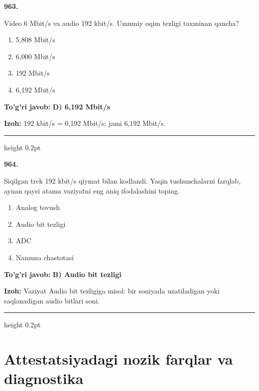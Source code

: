 \documentclass[10pt,a4paper,oneside]{article}
\begin{document}
\noindent\textbf{\color{ink}963.}
\par
Video 6 Mbit/s va audio 192 kbit/s. Umumiy oqim tezligi taxminan qancha?
\begin{enumerate}[label=\Alph*),leftmargin=9mm]
\item 5,808 Mbit/s
\item 6,000 Mbit/s
\item 192 Mbit/s
\item 6,192 Mbit/s
\end{enumerate}
\begin{tcolorbox}[enhanced,breakable,colback=teal!4,colframe=teal!50!black,boxrule=0.5pt,arc=1.1mm,left=3mm,right=3mm,top=1.7mm,bottom=1.7mm,before skip=2mm,after skip=2mm]
\textbf{\color{teal}To'g'ri javob:} \textbf{D) 6,192 Mbit/s}
\par\smallskip
\textbf{Izoh:} 192 kbit/s = 0,192 Mbit/s; jami 6,192 Mbit/s.
\end{tcolorbox}
\vspace{2mm}\hrule height 0.2pt \vspace{3mm}

\noindent\textbf{\color{ink}964.}
\par
Siqilgan trek 192 kbit/s qiymat bilan kodlandi. Yaqin tushunchalarni farqlab, aynan qaysi atama vaziyatni eng aniq ifodalashini toping.
\begin{enumerate}[label=\Alph*),leftmargin=9mm]
\item Analog tovush
\item Audio bit tezligi
\item ADC
\item Namuna chastotasi
\end{enumerate}
\begin{tcolorbox}[enhanced,breakable,colback=teal!4,colframe=teal!50!black,boxrule=0.5pt,arc=1.1mm,left=3mm,right=3mm,top=1.7mm,bottom=1.7mm,before skip=2mm,after skip=2mm]
\textbf{\color{teal}To'g'ri javob:} \textbf{B) Audio bit tezligi}
\par\smallskip
\textbf{Izoh:} Vaziyat Audio bit tezligiga misol: bir soniyada uzatiladigan yoki saqlanadigan audio bitlari soni.
\end{tcolorbox}
\vspace{2mm}\hrule height 0.2pt \vspace{3mm}
\section{Attestatsiyadagi nozik farqlar va diagnostika}
\end{document}
